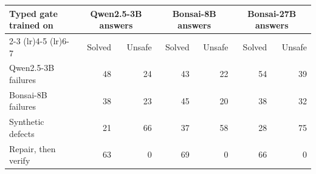 \begin{tabular}{lrrrrrr}
\toprule
Typed gate trained on & \multicolumn{2}{c}{Qwen2.5-3B answers} & \multicolumn{2}{c}{Bonsai-8B answers} & \multicolumn{2}{c}{Bonsai-27B answers} \\
\cmidrule(lr){2-3} \cmidrule(lr){4-5} \cmidrule(lr){6-7}
 & Solved & Unsafe & Solved & Unsafe & Solved & Unsafe \\
\midrule
Qwen2.5-3B failures & 48 & 24 & 43 & 22 & 54 & 39 \\
Bonsai-8B failures & 38 & 23 & 45 & 20 & 38 & 32 \\
Synthetic defects & 21 & 66 & 37 & 58 & 28 & 75 \\
Repair, then verify & 63 & 0 & 69 & 0 & 66 & 0 \\
\bottomrule
\end{tabular}
